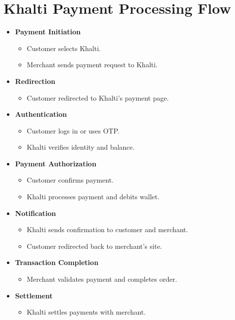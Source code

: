 \documentclass[12pt, a4paper, oneside]{article}
\begin{document}
\section*{Khalti Payment Processing Flow }
\begin{itemize}
  \item \textbf{Payment Initiation}
    \begin{itemize}
      \item Customer selects Khalti.
      \item Merchant sends payment request to Khalti.
    \end{itemize}

  \item \textbf{Redirection}
    \begin{itemize}
      \item Customer redirected to Khalti's payment page.
    \end{itemize}

  \item \textbf{Authentication}
    \begin{itemize}
      \item Customer logs in or uses OTP.
      \item Khalti verifies identity and balance.
    \end{itemize}

  \item \textbf{Payment Authorization}
    \begin{itemize}
      \item Customer confirms payment.
      \item Khalti processes payment and debits wallet.
    \end{itemize}

  \item \textbf{Notification}
    \begin{itemize}
      \item Khalti sends confirmation to customer and merchant.
      \item Customer redirected back to merchant's site.
    \end{itemize}

  \item \textbf{Transaction Completion}
    \begin{itemize}
      \item Merchant validates payment and completes order.
    \end{itemize}

  \item \textbf{Settlement}
    \begin{itemize}
      \item Khalti settles payments with merchant.
    \end{itemize}
\end{itemize}
\end{document}

